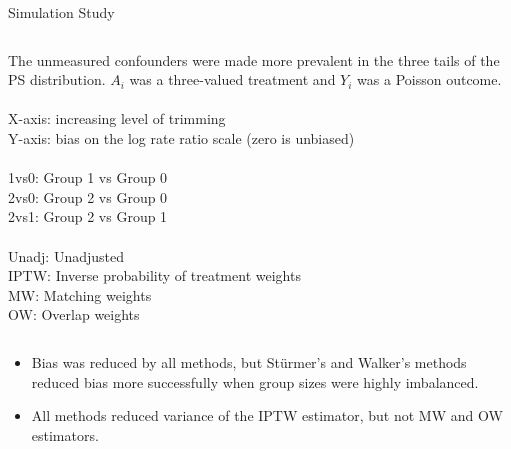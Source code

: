 \documentclass[final]{beamer}
\begin{document}
\begin{frame}[label={sec:org6cddcf1}]{}
\begin{columns}
\begin{column}[t]{0.48\columnwidth}
\begin{block}{Simulation Study}
\begin{exampleblock}{}
\begin{columns}
\begin{column}{0.3\columnwidth}
\scriptsize
\begin{center}
\end{center}
\tiny
The unmeasured confounders were made more prevalent in the three tails of the PS distribution. \(A_{i}\) was a three-valued treatment and \(Y_{i}\) was a Poisson outcome.\\
~\\

\tiny
\alert{X-axis}: increasing level of trimming\\
\alert{Y-axis}: bias on the log rate ratio scale (zero is unbiased)\\
~\\
\alert{1vs0}: Group 1 vs Group 0\\
\alert{2vs0}: Group 2 vs Group 0\\
\alert{2vs1}: Group 2 vs Group 1\\
~\\
\alert{Unadj}: Unadjusted\\
\alert{IPTW}: Inverse probability of treatment weights\\
\alert{MW}: Matching weights \cite{YoshidaMatchingWeightsSimultaneously2017}\\
\alert{OW}: Overlap weights \cite{LiBalancingCovariatesPropensity2016}\\
\end{column}
\end{columns}
\end{exampleblock}

\begin{exampleblock}{}
\begin{itemize}
\item Bias was reduced by all methods, but Stürmer's and Walker's methods reduced bias more successfully when group sizes were highly imbalanced.
\item All methods reduced variance of the IPTW estimator, but not MW and OW estimators.
\end{itemize}
\end{exampleblock}
\end{block}


\end{column}
\end{columns}
\end{frame}
\end{document}
